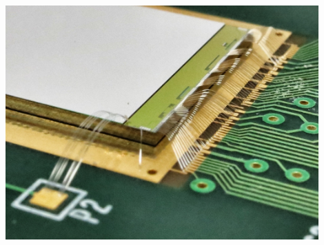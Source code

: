 \begin{frame}
\begin{columns}
    \centering
    \includegraphics[width=0.9\textwidth]{figures/Advacam-50um-assembly.jpeg}
  \end{columns}

\end{frame}

